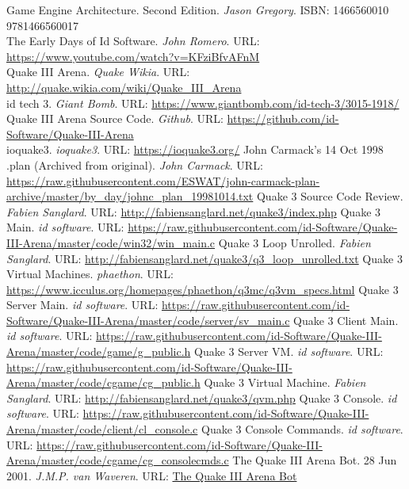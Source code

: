 \documentclass[a4paper,12pt]{report}
\begin{document}
	\begin{thebibliography}{9}
		Game Engine Architecture. Second Edition. \emph{Jason Gregory}. ISBN: 1466560010 9781466560017\\
		The Early Days of Id Software. \emph{John Romero}. URL: \url{https://www.youtube.com/watch?v=KFziBfvAFnM}\\
		Quake III Arena. \emph{Quake Wikia}. URL: \url{http://quake.wikia.com/wiki/Quake_III_Arena}\\
		 id tech 3. \emph{Giant Bomb}. URL: \url{https://www.giantbomb.com/id-tech-3/3015-1918/}\\
		 Quake III Arena Source Code. \emph{Github}. URL: \url{https://github.com/id-Software/Quake-III-Arena}\\
		 ioquake3. \emph{ioquake3}. URL: \url{https://ioquake3.org/}
         John Carmack's 14 Oct 1998 .plan (Archived from original). \emph{John Carmack}. URL: \url{https://raw.githubusercontent.com/ESWAT/john-carmack-plan-archive/master/by_day/johnc_plan_19981014.txt}
		 Quake 3 Source Code Review. \emph{Fabien Sanglard}. URL: \url{http://fabiensanglard.net/quake3/index.php}
		 Quake 3 Main. \emph{id software}. URL: \url{https://raw.githubusercontent.com/id-Software/Quake-III-Arena/master/code/win32/win_main.c}
         Quake 3 Loop Unrolled. \emph{Fabien Sanglard}. URL: \url{http://fabiensanglard.net/quake3/q3_loop_unrolled.txt}
         Quake 3 Virtual Machines. \emph{phaethon}. URL: \url{https://www.icculus.org/homepages/phaethon/q3mc/q3vm_specs.html}
         Quake 3 Server Main. \emph{id software}. URL: \url{https://raw.githubusercontent.com/id-Software/Quake-III-Arena/master/code/server/sv_main.c}
         Quake 3 Client Main. \emph{id software}. URL: \url{https://raw.githubusercontent.com/id-Software/Quake-III-Arena/master/code/game/g_public.h}
         Quake 3 Server VM. \emph{id software}. URL: \url{https://raw.githubusercontent.com/id-Software/Quake-III-Arena/master/code/cgame/cg_public.h}
         Quake 3 Virtual Machine. \emph{Fabien Sanglard}. URL: \url{http://fabiensanglard.net/quake3/qvm.php}
		 Quake 3 Console. \emph{id software}. URL: \url{https://raw.githubusercontent.com/id-Software/Quake-III-Arena/master/code/client/cl_console.c}
		 Quake 3 Console Commands. \emph{id software}. URL: \url{https://raw.githubusercontent.com/id-Software/Quake-III-Arena/master/code/cgame/cg_consolecmds.c}	
		 The Quake III Arena Bot. 28 Jun 2001. \emph{J.M.P. van Waveren}. URL: \url{The Quake III Arena Bot}		
	\end{thebibliography}


	
	
\end{document}
